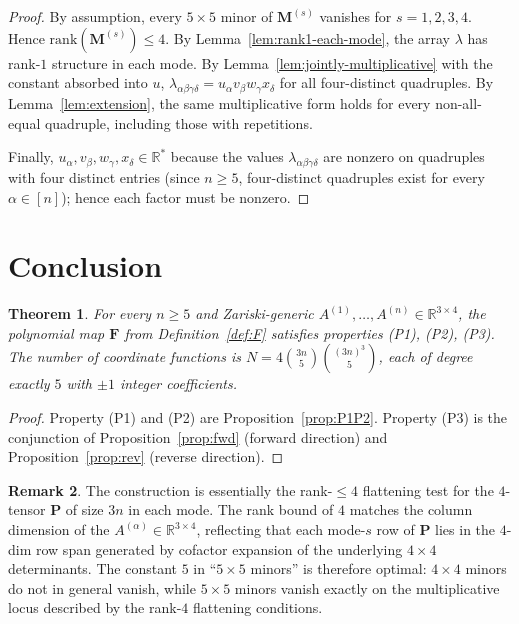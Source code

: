 \documentclass[12pt]{article}
\newtheorem{theorem}{Theorem}
\theoremstyle{definition}
\newtheorem{remark}[theorem]{Remark}
\begin{document}
\begin{proof}
By assumption, every $5\times 5$ minor of $\mathbf{M}^{(s)}$ vanishes for $s=1,2,3,4$. Hence
$\mathrm{rank}(\mathbf{M}^{(s)})\leq 4$. By Lemma~\ref{lem:rank1-each-mode}, the array
$\lambda$ has rank-$1$ structure in each mode. By
Lemma~\ref{lem:jointly-multiplicative} with the constant absorbed into $u$,
$\lambda_{\alpha\beta\gamma\delta}=u_\alpha v_\beta w_\gamma x_\delta$ for all
four-distinct quadruples. By Lemma~\ref{lem:extension}, the same multiplicative form holds
for every non-all-equal quadruple, including those with repetitions.

Finally, $u_\alpha,v_\beta,w_\gamma,x_\delta\in\mathbb{R}^*$ because the values
$\lambda_{\alpha\beta\gamma\delta}$ are nonzero on quadruples with four distinct entries
(since $n\geq 5$, four-distinct quadruples exist for every $\alpha\in[n]$); hence each
factor must be nonzero.
\end{proof}

\section{Conclusion}\label{sec:conclusion}

\begin{theorem}\label{thm:main}
For every $n\geq 5$ and Zariski-generic $A^{(1)},\ldots,A^{(n)}\in\mathbb{R}^{3\times 4}$,
the polynomial map $\mathbf{F}$ from Definition~\ref{def:F} satisfies properties (P1),
(P2), (P3). The number of coordinate functions is $N=4\binom{3n}{5}\binom{(3n)^3}{5}$, each
of degree exactly $5$ with $\pm 1$ integer coefficients.
\end{theorem}

\begin{proof}
Property (P1) and (P2) are Proposition~\ref{prop:P1P2}. Property (P3) is the conjunction of
Proposition~\ref{prop:fwd} (forward direction) and Proposition~\ref{prop:rev} (reverse
direction).
\end{proof}

\begin{remark}
The construction is essentially the rank-$\leq 4$ flattening test for the $4$-tensor
$\mathbf{P}$ of size $3n$ in each mode. The rank bound of $4$ matches the column dimension
of the $A^{(\alpha)}\in\mathbb{R}^{3\times 4}$, reflecting that each mode-$s$ row of
$\mathbf{P}$ lies in the $4$-dim row span generated by cofactor expansion of the underlying
$4\times 4$ determinants. The constant $5$ in ``$5\times 5$ minors'' is therefore optimal:
$4\times 4$ minors do not in general vanish, while $5\times 5$ minors vanish exactly on the
multiplicative locus described by the rank-$4$ flattening conditions.
\end{remark}
\end{document}
